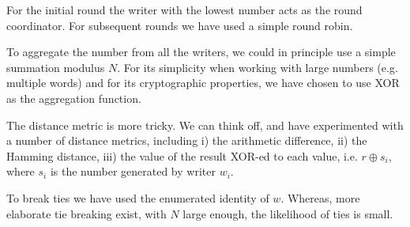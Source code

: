 \documentclass[10pt]{article}
\begin{document}
For the initial round the writer with the lowest number acts as the round coordinator. For subsequent rounds we have used a simple round robin. 

To aggregate the number from all the writers, we could in principle use a simple summation modulus $N$. For its simplicity when working with large numbers (e.g. multiple words) and for its cryptographic properties, we have chosen to use XOR as the aggregation function.

The distance metric is more tricky. We can think off, and have experimented with a number of distance metrics, including i) the arithmetic difference, ii) the Hamming distance, iii) the value of the result XOR-ed to each value, i.e. $r \oplus s_i$, where $s_i$ is the number generated by writer $w_i$. 

To break ties we have used the enumerated identity of $w$. Whereas, more elaborate tie breaking exist, with $N$ large enough, the likelihood of ties is small.



\end{document}
